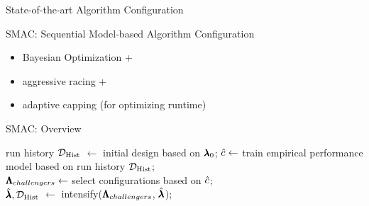 \begin{frame}[c]{State-of-the-art Algorithm Configuration}

SMAC: Sequential Model-based Algorithm Configuration 

\begin{itemize}
	\item Bayesian Optimization +
	\item aggressive racing +
	\item adaptive capping (for optimizing runtime)
\end{itemize}

\end{frame}
\begin{frame}[c]{SMAC: Overview }

\LinesNotNumbered
\begin{algorithm}[H]
\BlankLine
run history $\mathcal{D}_{\text{Hist}}$ $\leftarrow$ initial design based on $\pmb{\lambda}_0$; 
 {
	\pause
	$\hat{c} \leftarrow$ train empirical performance model based on run history $\mathcal{D}_{\text{Hist}}$;\\
	\pause
	$\pmb{\Lambda}_{challengers} \leftarrow$ select configurations based on $\hat{c}$;\\
	\pause
	$\hat{\pmb{\lambda}}, \mathcal{D}_{\text{Hist}}$  $\leftarrow$ intensify($\pmb{\Lambda}_{challengers}$, $\hat{\conf}$); 
}
\pause
\Return{$\hat{\conf}$}
\caption{SMAC}
\end{algorithm}

\end{frame}


